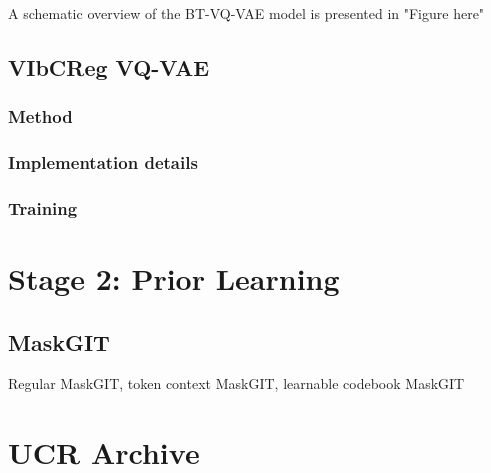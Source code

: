 \documentclass[../../thesis.tex]{subfiles}
\begin{document}
A schematic overview of the BT-VQ-VAE model is presented in "Figure here"



\subsection{VIbCReg VQ-VAE}

\subsubsection{Method}

\subsubsection{Implementation details}

\subsubsection{Training}

\section{Stage 2: Prior Learning}

\subsection{MaskGIT}
Regular MaskGIT, token context MaskGIT, learnable codebook MaskGIT


\section{UCR Archive}
\end{document}
